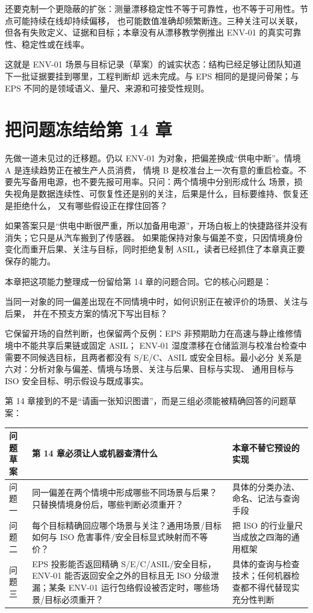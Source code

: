 还要克制一个更隐蔽的扩张：测量漂移稳定性不等于可靠性，也不等于可用性。节点可能持续在线却持续偏移，
也可能数值准确却频繁断连。三种关注可以关联，但各有失败定义、证据和目标；本章没有从漂移教学例推出
ENV-01 的真实可靠性、稳定性或在线率。

这就是 ENV-01 场景与目标记录（草案）的诚实状态：结构已经足够让团队知道下一批证据要挂到哪里，工程判断却
远未完成。与 EPS 相同的是提问骨架；与 EPS 不同的是领域语义、量尺、来源和可接受性规则。

\section{把问题冻结给第 14 章}

先做一道未见过的迁移题。仍以 ENV-01 为对象，把偏差换成“供电中断”。情境 A 是连续趋势正在被生产人员消费，
情境 B 是校准台上一次有意的重启检查。不要先写备用电源，也不要先报可用率。只问：两个情境中分别形成什么
场景，损失视角是数据连续性、可恢复性还是别的关注，后果是什么，目标要维持、恢复还是拒绝什么，
又有哪些假设正在撑住回答？

如果答案只是“供电中断很严重，所以加备用电源”，开场白板上的快捷路径并没有消失；它只是从汽车搬到了传感器。
如果能保持对象与偏差不变，只因情境身份变化而重开后果、关注与目标，同时拒绝复制
ASIL，读者已经抓住了本章真正要保存的能力。

本章把这项能力整理成一份留给第 14 章的问题合同。它的核心问题是：

\begin{noteblock}
当同一对象的同一偏差出现在不同情境中时，如何识别正在被评价的场景、关注与后果，
并在不预支方案的情况下写出目标？
\end{noteblock}

它保留开场的自然判断，也保留两个反例：EPS 非预期助力在高速与静止维修情境中不能共享后果链或固定 ASIL；
ENV-01 湿度漂移在仓储监测与校准台检查中需要不同候选目标，且两者都没有 S/E/C、ASIL 或安全目标。最小必分
关系是六对：分析对象与偏差、情境与场景、关注与后果、目标与实现、
通用目标与 ISO 安全目标、明示假设与既成事实。

第 14 章接到的不是“请画一张知识图谱”，而是三组必须能被精确回答的问题草案：

\begin{center}
\begingroup\small
\setlength{\tabcolsep}{4pt}
\begin{tabularx}{\linewidth}{@{}XXX@{}}
\toprule
问题草案 & 第 14 章必须让人或机器查清什么 & 本章不替它预设的实现 \\
\midrule
问题一 & 同一偏差在两个情境中形成哪些不同场景与后果？只替换情境身份后，哪些判断必须重开？ & 具体的分类办法、命名、记法与查询手段 \\
问题二 & 每个目标精确回应哪个场景与关注？通用场景/目标如何与 ISO 危害事件/安全目标显式映射而不等价？ & 把 ISO 的行业量尺当成放之四海的通用框架 \\
问题三 & EPS 投影能否返回精确 S/E/C/ASIL/安全目标，ENV-01 能否返回安全之外的目标且无 ISO 分级泄漏；某条 ENV-01 运行包络假设被否定时，哪些场景/目标必须重开？ & 具体的查询与检查技术；任何机器检查都不得代替现实充分性判断 \\
\bottomrule
\end{tabularx}
\endgroup
\end{center}

